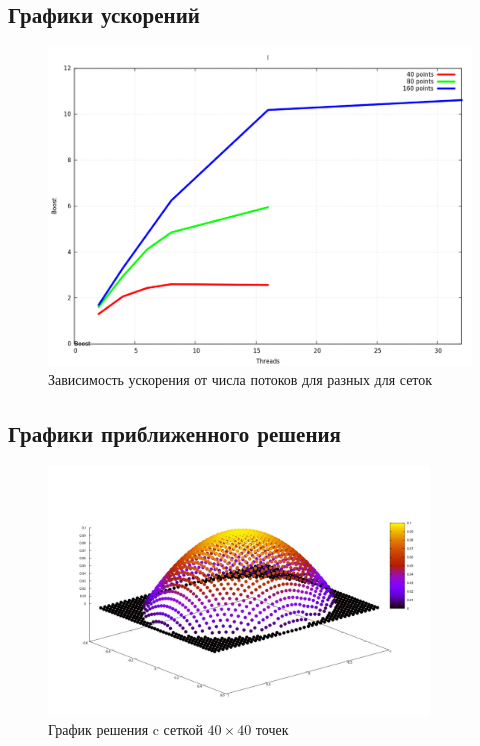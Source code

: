 \documentclass[oneside,final,14pt]{extreport}
\begin{document}
\newpage
\subsection{Графики ускорений}
\begin{figure}[ht!]
  \centering
  \includegraphics[width=1.0\textwidth]{picture5}
  \caption{Зависимость ускорения от числа потоков для разных для сеток}
\end{figure}

\newpage
\subsection{Графики приближенного решения}
\noindent
\begin{figure}[ht!]
  \centering
  \includegraphics[width=0.90\textwidth]{picture1}
  \caption{График решения c сеткой \( 40 \times 40 \) точек}
\end{figure}
\end{document}
